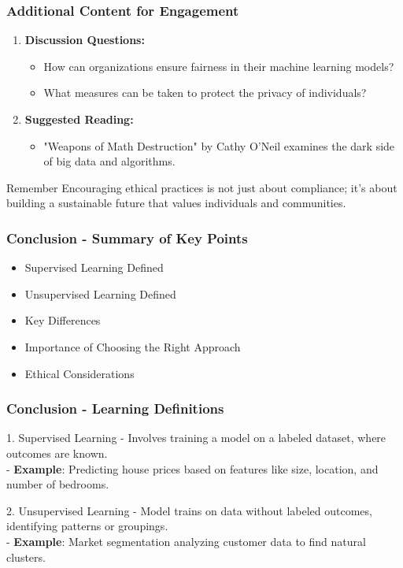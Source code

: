 \documentclass[aspectratio=169]{beamer}
\begin{document}
\begin{frame}[fragile]
    \frametitle{Additional Content for Engagement}
    \begin{enumerate}
        \item \textbf{Discussion Questions:}
            \begin{itemize}
                \item How can organizations ensure fairness in their machine learning models?
                \item What measures can be taken to protect the privacy of individuals?
            \end{itemize}
        \item \textbf{Suggested Reading:}
            \begin{itemize}
                \item "Weapons of Math Destruction" by Cathy O'Neil examines the dark side of big data and algorithms.
            \end{itemize}
    \end{enumerate}

    \begin{block}{Remember}
        Encouraging ethical practices is not just about compliance; it’s about building a sustainable future that values individuals and communities.
    \end{block}
\end{frame}

\begin{frame}[fragile]
    \frametitle{Conclusion - Summary of Key Points}
    \begin{itemize}
        \item Supervised Learning Defined
        \item Unsupervised Learning Defined
        \item Key Differences
        \item Importance of Choosing the Right Approach
        \item Ethical Considerations
    \end{itemize}
\end{frame}

\begin{frame}[fragile]
    \frametitle{Conclusion - Learning Definitions}
    \begin{block}{1. Supervised Learning}
        - Involves training a model on a labeled dataset, where outcomes are known.\\
        - \textbf{Example}: Predicting house prices based on features like size, location, and number of bedrooms.
    \end{block}
    
    \begin{block}{2. Unsupervised Learning}
        - Model trains on data without labeled outcomes, identifying patterns or groupings.\\
        - \textbf{Example}: Market segmentation analyzing customer data to find natural clusters.
    \end{block}
\end{frame}
\end{document}
